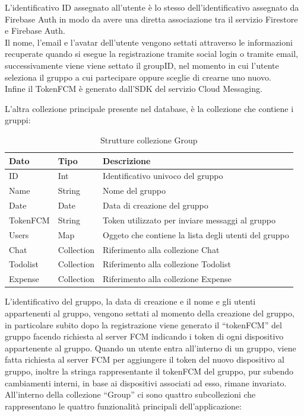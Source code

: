 L'identificativo ID assegnato all'utente è lo stesso dell'identificativo assegnato da Firebase Auth in modo da avere una diretta associazione tra il servizio Firestore e Firebase Auth.\\
Il nome, l'email e l'avatar dell'utente vengono settati attraverso le informazioni recuperate quando si esegue la registrazione tramite social login o tramite email, successivamente viene viene settato il groupID, nel momento in cui l'utente seleziona il gruppo a cui partecipare oppure sceglie di crearne uno nuovo.\\
Infine il TokenFCM è generato dall'SDK del servizio Cloud Messaging.

\newpage

L'altra collezione principale presente nel database, è la collezione che contiene i gruppi:

\begin{table}[h]
\begin{center}
\begin{tabular}{|l|l|p{9cm}|}
    \hline
\textbf{Dato} & \textbf{Tipo}  & \textbf{Descrizione}\\ \hline
ID & Int & Identificativo univoco del gruppo\\\hline
Name & String & Nome del gruppo \\ \hline
Date & Date & Data di creazione del gruppo \\ \hline
TokenFCM & String & Token utilizzato per inviare messaggi al gruppo \\ \hline
Users & Map & Oggeto che contiene la lista degli utenti del gruppo  \\ \hline
Chat & Collection &  Riferimento alla collezione Chat \\ \hline
Todolist & Collection &  Riferimento alla collezione Todolist \\ \hline
Expense & Collection & Riferimento alla collezione Expense \\
\hline
\end{tabular}
\caption[Struttura Group]{Strutture collezione Group}\label{tab:Struttura collezione Group}
\end{center}
\end{table}
L'identificativo del gruppo, la data di creazione e il nome e gli utenti appartenenti al gruppo, vengono settati al momento della creazione del gruppo, in particolare subito dopo la registrazione viene generato il ``tokenFCM'' del gruppo facendo richiesta al server FCM indicando i token di ogni dispositivo appartenente al gruppo.
Quando un utente entra all'interno di un gruppo, viene fatta richiesta al server FCM per aggiungere il token del nuovo dispositivo al gruppo, inoltre la stringa rappresentante il tokenFCM del gruppo, pur subendo cambiamenti interni, in base ai dispositivi associati ad esso, rimane invariato.\\
All'interno della collezione ``Group'' ci sono quattro subcollezioni che rappresentano le quattro funzionalità principali dell'applicazione:

